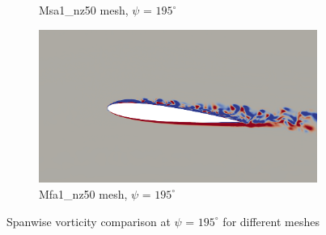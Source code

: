 \begin{figure}[H]
\begin{subfigure}[b]{0.475\textwidth}
\caption{Msa1\_nz50 mesh, $\psi$ = $195^\circ$}
\label{fig:hadapt_psi195}
\end{subfigure}
\begin{subfigure}[b]{0.475\textwidth}
\centering
\includegraphics[width=1\textwidth]{figures/adapt_strat/vorticity_plots/Mfa1_50/phase_195.png}
\caption{Mfa1\_nz50 mesh, $\psi$ = $195^\circ$}
\label{fig:FB_psi195}
\end{subfigure}
\caption{Spanwise vorticity comparison at $\psi$ = $195^\circ$ for different meshes}
\label{fig:vorticity_195}
\end{figure}



